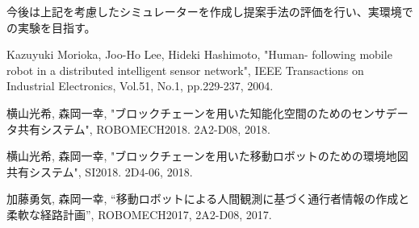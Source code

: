 \documentclass{jsarticle}
\begin{document}
今後は上記を考慮したシミュレーターを作成し提案手法の評価を行い、実環境での実験を目指す。






\footnotesize
\begin{thebibliography}{99}

Kazuyuki Morioka, Joo-Ho Lee, Hideki Hashimoto, "Human- following mobile robot in a distributed intelligent sensor network", IEEE Transactions on Industrial Electronics, Vol.51, No.1, pp.229-237, 2004.

横山光希, 森岡一幸, "ブロックチェーンを用いた知能化空間のためのセンサデータ共有システム", ROBOMECH2018. 2A2-D08, 2018.

横山光希, 森岡一幸, "ブロックチェーンを用いた移動ロボットのための環境地図共有システム", SI2018. 2D4-06, 2018.

加藤勇気, 森岡一幸, “移動ロボットによる人間観測に基づく通行者情報の作成と柔軟な経路計画”, ROBOMECH2017, 2A2-D08, 2017.




\end{thebibliography}

\normalsize
\end{document}
